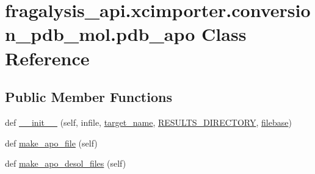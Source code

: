 \hypertarget{classfragalysis__api_1_1xcimporter_1_1conversion__pdb__mol_1_1pdb__apo}{}\section{fragalysis\+\_\+api.\+xcimporter.\+conversion\+\_\+pdb\+\_\+mol.\+pdb\+\_\+apo Class Reference}
\label{classfragalysis__api_1_1xcimporter_1_1conversion__pdb__mol_1_1pdb__apo}
\subsection*{Public Member Functions}
\begin{DoxyCompactItemize}
\item 
def \hyperlink{classfragalysis__api_1_1xcimporter_1_1conversion__pdb__mol_1_1pdb__apo_a4653e7fd666b7fd8e5bc4fe230e5e424}{\+\_\+\+\_\+init\+\_\+\+\_\+} (self, infile, \hyperlink{classfragalysis__api_1_1xcimporter_1_1conversion__pdb__mol_1_1pdb__apo_a334c98d4dfa204c7673f2f0bffdc60e1}{target\+\_\+name}, \hyperlink{classfragalysis__api_1_1xcimporter_1_1conversion__pdb__mol_1_1pdb__apo_a110bfcd93d73bebd25ec64b258bd5b6a}{R\+E\+S\+U\+L\+T\+S\+\_\+\+D\+I\+R\+E\+C\+T\+O\+RY}, \hyperlink{classfragalysis__api_1_1xcimporter_1_1conversion__pdb__mol_1_1pdb__apo_a120a453eb2a3608650eda92ee0dc9ef9}{filebase})
\item 
def \hyperlink{classfragalysis__api_1_1xcimporter_1_1conversion__pdb__mol_1_1pdb__apo_a08488b34eeb131d43d3139ecbbdb78fb}{make\+\_\+apo\+\_\+file} (self)
\item 
def \hyperlink{classfragalysis__api_1_1xcimporter_1_1conversion__pdb__mol_1_1pdb__apo_ab88e88fe9d512e1635e5f1d61040f9f6}{make\+\_\+apo\+\_\+desol\+\_\+files} (self)
\end{DoxyCompactItemize}
